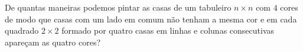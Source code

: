 De quantas maneiras podemos pintar as casas de um tabuleiro $n \times n$ com $4$ cores de modo que casas com um lado em comum não tenham a mesma cor e em cada quadrado $2 \times 2$ formado por quatro casas em linhas e colunas consecutivas apareçam as quatro cores?